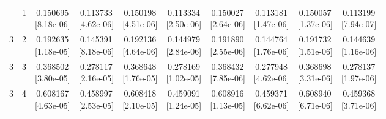 \documentclass[12pt,letterpaper]{article}
\theoremstyle{plain}
\theoremstyle{definition}
\begin{document}
\begin{table}[p]
\begin{adjustbox}{max width=\linewidth}
\begin{tabular}{@{}rr*{8}{c}@{}}
\addlinespace[2pt]
3 & 1 & \shortstack{0.150695\\[-1pt]{\scriptsize[8.18e-06]}} & \shortstack{0.113733\\[-1pt]{\scriptsize[4.62e-06]}} & \shortstack{0.150198\\[-1pt]{\scriptsize[4.51e-06]}} & \shortstack{0.113334\\[-1pt]{\scriptsize[2.50e-06]}} & \shortstack{0.150027\\[-1pt]{\scriptsize[2.64e-06]}} & \shortstack{0.113181\\[-1pt]{\scriptsize[1.47e-06]}} & \shortstack{0.150057\\[-1pt]{\scriptsize[1.37e-06]}} & \shortstack{0.113199\\[-1pt]{\scriptsize[7.94e-07]}}\\
3 & 2 & \shortstack{0.192635\\[-1pt]{\scriptsize[1.18e-05]}} & \shortstack{0.145391\\[-1pt]{\scriptsize[8.18e-06]}} & \shortstack{0.192136\\[-1pt]{\scriptsize[4.64e-06]}} & \shortstack{0.144979\\[-1pt]{\scriptsize[2.84e-06]}} & \shortstack{0.191890\\[-1pt]{\scriptsize[2.55e-06]}} & \shortstack{0.144764\\[-1pt]{\scriptsize[1.76e-06]}} & \shortstack{0.191732\\[-1pt]{\scriptsize[1.51e-06]}} & \shortstack{0.144639\\[-1pt]{\scriptsize[1.16e-06]}}\\
3 & 3 & \shortstack{0.368502\\[-1pt]{\scriptsize[3.80e-05]}} & \shortstack{0.278117\\[-1pt]{\scriptsize[2.16e-05]}} & \shortstack{0.368648\\[-1pt]{\scriptsize[1.76e-05]}} & \shortstack{0.278169\\[-1pt]{\scriptsize[1.02e-05]}} & \shortstack{0.368432\\[-1pt]{\scriptsize[7.85e-06]}} & \shortstack{0.277948\\[-1pt]{\scriptsize[4.62e-06]}} & \shortstack{0.368698\\[-1pt]{\scriptsize[3.31e-06]}} & \shortstack{0.278137\\[-1pt]{\scriptsize[1.97e-06]}}\\
3 & 4 & \shortstack{0.608167\\[-1pt]{\scriptsize[4.63e-05]}} & \shortstack{0.458997\\[-1pt]{\scriptsize[2.53e-05]}} & \shortstack{0.608418\\[-1pt]{\scriptsize[2.10e-05]}} & \shortstack{0.459091\\[-1pt]{\scriptsize[1.24e-05]}} & \shortstack{0.608916\\[-1pt]{\scriptsize[1.13e-05]}} & \shortstack{0.459371\\[-1pt]{\scriptsize[6.62e-06]}} & \shortstack{0.608940\\[-1pt]{\scriptsize[6.71e-06]}} & \shortstack{0.459368\\[-1pt]{\scriptsize[3.71e-06]}}\\

\end{tabular}
\end{adjustbox}
\end{table}
\end{document}
